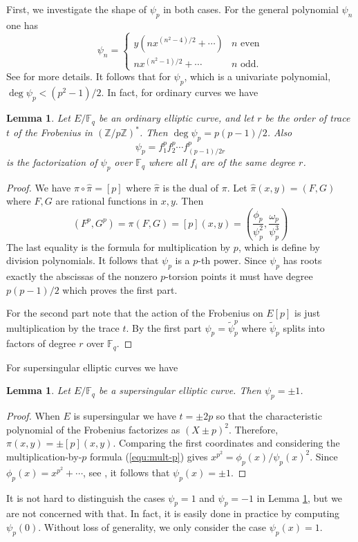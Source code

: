 \documentclass[12pt]{article}
\theoremstyle{plain}
\newtheorem{lemma}[theorem]{Lemma}
\theoremstyle{definition}
\def\Z{\ensuremath{\mathbb{Z}}}
\def\F{\ensuremath{\mathbb{F}}}
\begin{document}
First, we investigate the shape of $\psi_p$ in both cases. For the general polynomial $\psi_n$ one 
has
\[
\psi_n =
\begin{cases}
	y(nx^{(n^2 - 4) / 2} + \cdots) & n \text{ even} \\
	nx^{(n^2 - 1) / 2} + \cdots & n \text{ odd.}
\end{cases}
\]
See \cite{washington2008} for more details. It follows that for $\psi_p$, which is a univariate 
polynomial, $\deg \psi_p < (p^2 - 1) / 2$. In fact, for ordinary curves we have
\begin{lemma}
	\label{lem:ord_divpoly}
	Let $E/\F_q$ be an ordinary elliptic curve, and let $r$ be the order of trace $t$ of the 
	Frobenius in $(\Z / p\Z)^*$. Then $\deg \psi_p = p(p - 1) / 2$. Also
	\[ \psi_p = f_1^pf_2^p \cdots f_{(p - 1) / 2r}^p \]
	is the factorization of $\psi_p$ over $\F_q$ where all $f_i$ are of the same degree $r$.
\end{lemma}
\begin{proof}
	We have $\pi \circ \hat{\pi} = [p]$ where $\hat{\pi}$ is the dual of $\pi$. Let $\hat{\pi}(x, 
	y) = (F, G)$ where $F, G$ are rational functions in $x, y$. Then
	\begin{equation}
	\label{equ:mult-p}
		(F^p, G^p) = \pi(F, G) = [p](x, y) = \left( \frac{\phi_p}{\psi_p^2}, 		
		\frac{\omega_p}{\psi_p^3} \right)
	\end{equation}
	The last equality is the formula for multiplication by $p$, which is define by division 
	polynomials. It follows that $\psi_p$ is a $p$-th power. Since $\psi_p$ has roots exactly the 
	abscissas of the nonzero $p$-torsion points it must have degree $p(p - 1) / 2$ which proves the 
	first part.
	
	For the second part note that the action of the Frobenius on $E[p]$ is just multiplication by 
	the trace $t$. By the first part $\psi_p = \tilde{\psi}_p^p$ where $\tilde{\psi}_p$ splits into 
	factors of degree $r$ over $\F_q$.
\end{proof}
For supersingular elliptic curves we have
\begin{lemma}
	\label{lem:ss_divpoly}
	Let $E/\F_q$ be a supersingular elliptic curve. Then $\psi_p = \pm 1$.
\end{lemma}
\begin{proof}
	When $E$ is supersingular we have $t = \pm 2p$ so that the characteristic polynomial of the 
	Frobenius factorizes as $(X \pm p)^2$. Therefore, $\pi(x, y) = \pm [p](x, y)$. Comparing the 
	first coordinates and considering the multiplication-by-$p$ formula (\ref{equ:mult-p}) gives 
	$x^{p^2} = \phi_p(x) / \psi_p(x)^2$. Since $\phi_p(x) = x^{p^2} + \cdots$, see 
	\cite{washington2008}, it follows that $\psi_p(x) = \pm 1$.
\end{proof}
It is not hard to distinguish the cases $\psi_p = 1$ and $\psi_p = -1$ in Lemma 
\ref{lem:ss_divpoly}, but we are not concerned with that. In fact, it is easily done in practice by 
computing $\psi_p(0)$. Without loss of generality, we only consider the case $\psi_p(x) = 1$.
\end{document}
